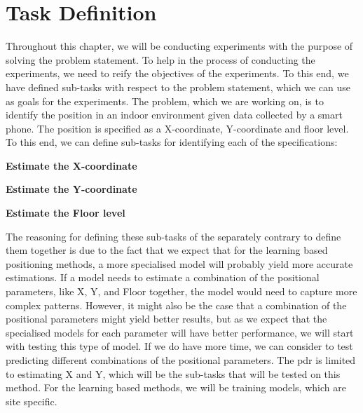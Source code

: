 \section{Task Definition}
Throughout this chapter, we will be conducting experiments with the purpose of solving the problem statement. To help in the process of conducting the experiments, we need to reify the objectives of the experiments. To this end, we have defined sub-tasks with respect to the problem statement, which we can use as goals for the experiments. The problem, which we are working on, is to identify the position in an indoor environment given data collected by a smart phone. The position is specified as a X-coordinate, Y-coordinate and floor level. To this end, we can define sub-tasks for identifying each of the specifications:
\begin{center}
    \textbf{Estimate the X-coordinate}
\end{center}
\vspace{-0.65cm}
\begin{center}
    \textbf{Estimate the Y-coordinate}
\end{center}
\vspace{-0.65cm}
\begin{center}
    \textbf{Estimate the Floor level}
\end{center}

The reasoning for defining these sub-tasks of the separately contrary to define them together is due to the fact that we expect that for the learning based positioning methods, a more specialised model will probably yield more accurate estimations. If a model needs to estimate a combination of the positional parameters, like X, Y, and Floor together, the model would need to capture more complex patterns. However, it might also be the case that a combination of the positional parameters might yield better results, but as we expect that the specialised models for each parameter will have better performance, we will start with testing this type of model. If we do have more time, we can consider to test predicting different combinations of the positional parameters. The \gls{pdr} is limited to estimating X and Y, which will be the sub-tasks that will be tested on this method. For the learning based methods, we will be training models, which are site specific.


